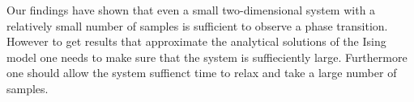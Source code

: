 Our findings have shown that even a small two-dimensional system with a relatively small number of samples is sufficient to observe a phase transition. However to get results that approximate the analytical solutions of the Ising model one needs to make sure that the system is suffieciently large. Furthermore one should allow the system suffienct time to relax and take a large number of samples. 
